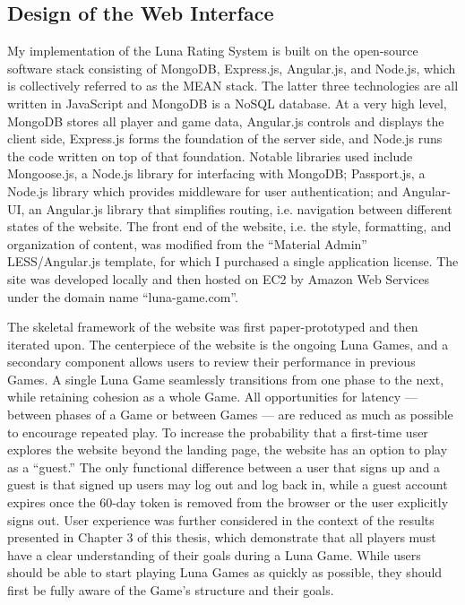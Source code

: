\subsection{Design of the Web Interface}

My implementation of the Luna Rating System is built on the open-source software stack consisting of MongoDB, Express.js, Angular.js, and Node.js, which is collectively referred to as the MEAN stack\cite{karpov2013mean}. The latter three technologies are all written in JavaScript and MongoDB is a NoSQL database. At a very high level, MongoDB stores all player and game data, Angular.js controls and displays the client side, Express.js forms the foundation of the server side, and Node.js runs the code written on top of that foundation. Notable libraries used include Mongoose.js, a Node.js library for interfacing with MongoDB; Passport.js, a Node.js library which provides middleware for user authentication; and Angular-UI, an Angular.js library that simplifies routing, i.e. navigation between different states of the website. The front end of the website, i.e. the style, formatting, and organization of content, was modified from the ``Material Admin'' LESS/Angular.js template, for which I purchased a single application license. The site was developed locally and then hosted on EC2 by Amazon Web Services under the domain name ``luna-game.com''.

The skeletal framework of the website was first paper-prototyped and then iterated upon\cite{rettig1994prototyping}. The centerpiece of the website is the ongoing Luna Games, and a secondary component allows users to review their performance in previous Games. A single Luna Game seamlessly transitions from one phase to the next, while retaining cohesion as a whole Game. All opportunities for latency --- between phases of a Game or between Games ---  are reduced as much as possible to encourage repeated play. To increase the probability that a first-time user explores the website beyond the landing page, the website has an option to play as a ``guest.'' The only functional difference between a user that signs up and a guest is that signed up users may log out and log back in, while a guest account expires once the 60-day token is removed from the browser or the user explicitly signs out. User experience was further considered in the context of the results presented in Chapter 3 of this thesis, which demonstrate that all players must have a clear understanding of their goals during a Luna Game. While users should be able to start playing Luna Games as quickly as possible, they should first be fully aware of the Game's structure and their goals.

